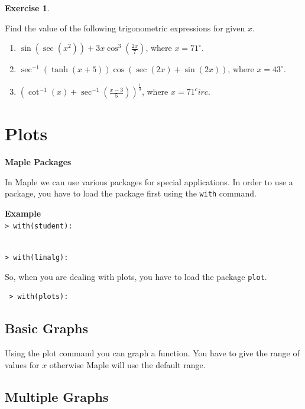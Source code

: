 \documentclass[
]{book}
\providecommand{\tightlist}{%
  \setlength{\itemsep}{0pt}\setlength{\parskip}{0pt}}
\theoremstyle{definition}
\theoremstyle{definition}
\theoremstyle{definition}
\newtheorem{exercise}{Exercise}[chapter]
\theoremstyle{definition}
\theoremstyle{remark}
\begin{document}
\begin{exercise}
\protect\hypertarget{exr:unnamed-chunk-23}{}\label{exr:unnamed-chunk-23}

Find the value of the following trigonometric expressions for given \(x\).

\begin{enumerate}
\def\labelenumi{\roman{enumi}.}
\tightlist
\item
  \(\sin(\sec(x^2)) + 3x\cos^3(\frac{2x}{7})\), where \(x = 71^\circ\).
\item
  \(\sec^{-1}(\tanh(x+5))\cos(\sec(2x) + \sin(2x))\), where \(x = 43^\circ\).
\item
  \(\left(\cot^{-1}(x) + \sec^{-1}(\frac{x-3}{5})\right)^{\frac{1}{3}}\), where \(x = 71^circ\).
\end{enumerate}

\end{exercise}

\chapter{Plots}\label{plots}

\textbf{Maple Packages}

In Maple we can use various packages for special applications. In order to use a package, you have to load the package first using the \texttt{with} command.

\textbf{Example}\\
\texttt{\textgreater{}\ with(student):}\strut \\
\texttt{\textgreater{}\ with(linalg):}

So, when you are dealing with plots, you have to load the package \texttt{plot}.

\begin{verbatim}
 > with(plots):
\end{verbatim}

\section{Basic Graphs}\label{basic-graphs}

Using the plot command you can graph a function. You have to give the range of values for \(x\) otherwise Maple will use the default range.

\section{Multiple Graphs}\label{multiple-graphs}
\end{document}
